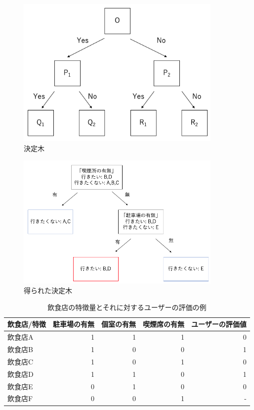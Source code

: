 \documentclass[12pt,a4j]{jreport}
\begin{document}
\begin{figure}[htbp]
  \begin{center}
    \includegraphics[width=10cm]{fig2.png}
    \caption{決定木}
    \label{fig2}
  \end{center}
\end{figure}

\begin{figure}[htbp]
  \begin{center}
    \includegraphics[width=10cm]{fig10.png}
    \caption{得られた決定木}
    \label{fig10}
  \end{center}
\end{figure}

\begin{table}[htbp]
  \begin{center}
    \begin{tabular}{|l|r|r|r|r|}\hline
      \textbf{飲食店/特徴} & 駐車場の有無 & 個室の有無 & 喫煙席の有無  &  ユーザーの評価値 \\ \hline
      飲食店A     & 1        & 1        & 1        & 0 \\ \hline
      飲食店B     & 1      & 0        & 0        & 1 \\ \hline
      飲食店C     & 1      & 0        & 1        & 0 \\ \hline
      飲食店D     & 1        & 1        & 0        & 1 \\ \hline
      飲食店E     & 0        & 1        & 0        & 0 \\ \hline
      飲食店F     & 0        & 0        & 1        & - \\ \hline
    \end{tabular}
  \end{center}
  \caption{飲食店の特徴量とそれに対するユーザーの評価の例}
  \label{table}
\end{table}
\end{document}

